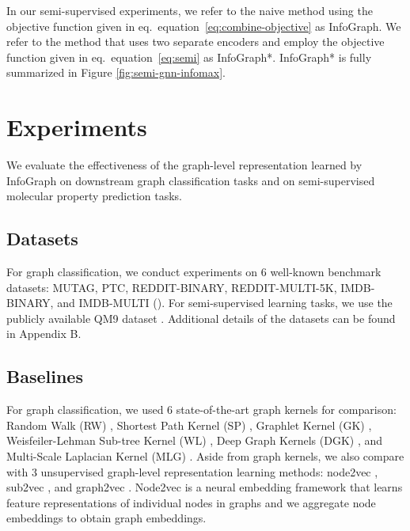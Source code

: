 \documentclass{article} \usepackage{iclr2020_conference,times}
\def\eqref#1{equation~\ref{#1}}
\def\method{InfoGraph}
\begin{document}
In our semi-supervised experiments, we refer to the naive method using the objective function given in eq.~\eqref{eq:combine-objective} as \method{}. We refer to the method that uses two separate encoders and employ the objective function given in eq.~\eqref{eq:semi} as \method{}*. \method{}* is fully summarized in Figure \ref{fig:semi-gnn-infomax}.























 

\section{Experiments}
We evaluate the effectiveness of the graph-level representation learned by \method{} on downstream graph classification tasks and on semi-supervised molecular property prediction tasks.

\subsection{Datasets}
For graph classification, we conduct experiments on 6 well-known benchmark datasets: MUTAG, PTC, REDDIT-BINARY, REDDIT-MULTI-5K, IMDB-BINARY, and IMDB-MULTI (\cite{yanardag2015deep}).
For semi-supervised learning tasks, we use the publicly available QM9 dataset \cite{ramakrishnan2014quantum}. 
Additional details of the datasets can be found in Appendix B.



\subsection{Baselines}

For graph classification, we used 6 state-of-the-art graph kernels for comparison: Random Walk (RW) \cite{gartner2003graph}, Shortest Path Kernel (SP) \cite{borgwardt2005shortest}, Graphlet Kernel (GK) \cite{shervashidze2009efficient}, Weisfeiler-Lehman Sub-tree Kernel (WL) \cite{shervashidze2011weisfeiler}, Deep Graph Kernels (DGK) \cite{yanardag2015deep}, and Multi-Scale Laplacian Kernel (MLG) \cite{kondor2016multiscale}. Aside from graph kernels, we also compare with 3 unsupervised graph-level representation learning methods: node2vec \cite{node2vec}, sub2vec \cite{sub2vec}, and graph2vec \cite{narayanan2017graph2vec}. Node2vec is a neural embedding framework that learns feature representations of individual nodes in graphs and we aggregate node embeddings to obtain graph embeddings.
\end{document}
